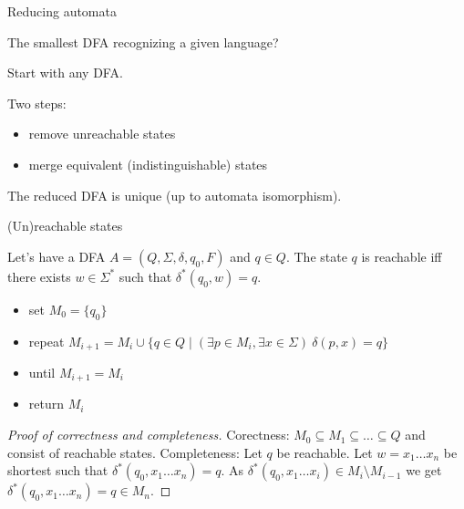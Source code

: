 \documentclass[handout]{beamer}
\begin{document}
\begin{frame}{Reducing automata}

    The smallest DFA recognizing a given language?

    Start with any DFA.

    Two steps:

    \begin{itemize}
        \item remove \alert{unreachable} states
        \item merge \alert{equivalent (indistinguishable)} states
    \end{itemize}

    The reduced DFA is unique (up to automata isomorphism).

\end{frame}


\begin{frame}{(Un)reachable states}

    \begin{definition}
        Let's have a DFA $A=(Q,\Sigma,\delta,q_0,F)$ and $q\in Q$. The state $q$ is \alert{reachable} iff there exists $w\in \Sigma^*$ such that $\delta^*(q_0,w)=q$. 
        \end{definition}
        
        \begin{algorithm}        
            \begin{itemize}
                \item set $M_0=\{q_0\}$
                \item repeat $M_{i+1}=M_i \cup \{q\in Q\mid (\exists p\in M_i, \exists x\in \Sigma)\ \delta(p,x)=q\}$
                \item until $M_{i+1}=M_i$
                \item return $M_i$
            \end{itemize}
        \end{algorithm}
        \begin{proof}[Proof of correctness and completeness]
           \alert{Corectness:} $M_0\subseteq M_1\subseteq \ldots\subseteq Q$ and consist of reachable states.
            \alert{Completeness:} Let $q$ be reachable. Let $w=x_1\ldots x_n$ be shortest such that $\delta^*(q_0,x_1\ldots x_n)=q$. As $\delta^*(q_0,x_1\ldots x_i)\in M_i\setminus M_{i-1}$ we get $\delta^*(q_0,x_1\ldots x_n)=q\in M_n$.
        \end{proof}

\end{frame}
\end{document}
